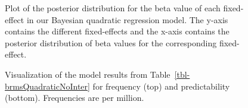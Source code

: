\documentclass[
  authoryear,
  preprint,
  1p,
  onecolumn]{elsarticle}
\begin{document}
\begin{figure}


\caption{\label{fig-posteriorplotFullQuadratic}Plot of the posterior
distribution for the beta value of each fixed-effect in our Bayesian
quadratic regression model. The y-axis contains the different
fixed-effects and the x-axis contains the posterior distribution of beta
values for the corresponding fixed-effect.}

\end{figure}%

\begin{figure}


\caption{\label{fig-FullQuadraticPlot}Visualization of the model results
from Table~\ref{tbl-brmsQuadraticNoInter} for frequency (top) and
predictability (bottom). Frequencies are per million.}

\end{figure}%
\end{document}
